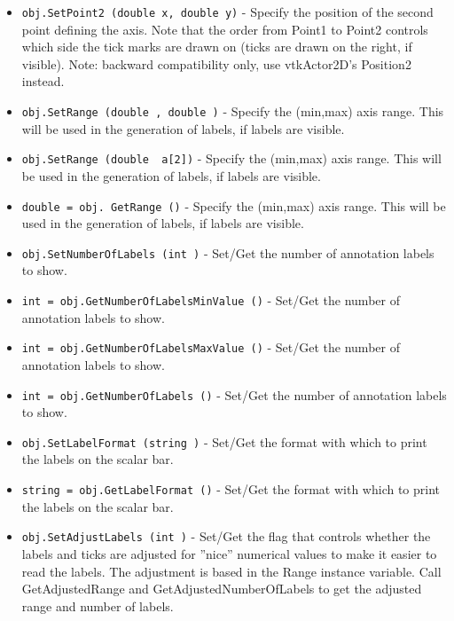 \begin{itemize}
\item  \verb|obj.SetPoint2 (double x, double y)| -  Specify the position of the second point defining the axis. Note that
 the order from Point1 to Point2 controls which side the tick marks
 are drawn on (ticks are drawn on the right, if visible).
 Note: backward compatibility only, use vtkActor2D's Position2 instead.

\item  \verb|obj.SetRange (double , double )| -  Specify the (min,max) axis range. This will be used in the generation
 of labels, if labels are visible.

\item  \verb|obj.SetRange (double  a[2])| -  Specify the (min,max) axis range. This will be used in the generation
 of labels, if labels are visible.

\item  \verb|double = obj. GetRange ()| -  Specify the (min,max) axis range. This will be used in the generation
 of labels, if labels are visible.

\item  \verb|obj.SetNumberOfLabels (int )| -  Set/Get the number of annotation labels to show.

\item  \verb|int = obj.GetNumberOfLabelsMinValue ()| -  Set/Get the number of annotation labels to show.

\item  \verb|int = obj.GetNumberOfLabelsMaxValue ()| -  Set/Get the number of annotation labels to show.

\item  \verb|int = obj.GetNumberOfLabels ()| -  Set/Get the number of annotation labels to show.

\item  \verb|obj.SetLabelFormat (string )| -  Set/Get the format with which to print the labels on the scalar
 bar.

\item  \verb|string = obj.GetLabelFormat ()| -  Set/Get the format with which to print the labels on the scalar
 bar.

\item  \verb|obj.SetAdjustLabels (int )| -  Set/Get the flag that controls whether the labels and ticks are
 adjusted for ''nice'' numerical values to make it easier to read 
 the labels. The adjustment is based in the Range instance variable.
 Call GetAdjustedRange and GetAdjustedNumberOfLabels to get the adjusted
 range and number of labels.


\end{itemize}
